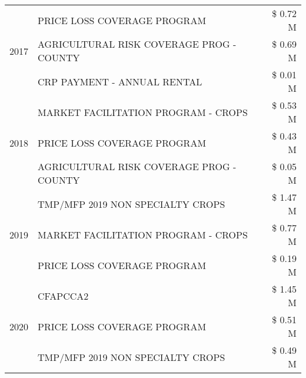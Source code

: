 \begin{tabular}{llr}
\cline{1-3}
\multirow[t]{3}{*}{2017} & PRICE LOSS COVERAGE PROGRAM & \$ 0.72 M \\
 & AGRICULTURAL RISK COVERAGE PROG - COUNTY & \$ 0.69 M \\
 & CRP PAYMENT - ANNUAL RENTAL & \$ 0.01 M \\
\cline{1-3}
\multirow[t]{3}{*}{2018} & MARKET FACILITATION PROGRAM - CROPS & \$ 0.53 M \\
 & PRICE LOSS COVERAGE PROGRAM & \$ 0.43 M \\
 & AGRICULTURAL RISK COVERAGE PROG - COUNTY & \$ 0.05 M \\
\cline{1-3}
\multirow[t]{3}{*}{2019} & TMP/MFP 2019 NON SPECIALTY CROPS & \$ 1.47 M \\
 & MARKET FACILITATION PROGRAM - CROPS & \$ 0.77 M \\
 & PRICE LOSS COVERAGE PROGRAM & \$ 0.19 M \\
\cline{1-3}
\multirow[t]{3}{*}{2020} & CFAPCCA2 & \$ 1.45 M \\
 & PRICE LOSS COVERAGE PROGRAM & \$ 0.51 M \\
 & TMP/MFP 2019 NON SPECIALTY CROPS & \$ 0.49 M \\
\cline{1-3}
\bottomrule
\end{tabular}
